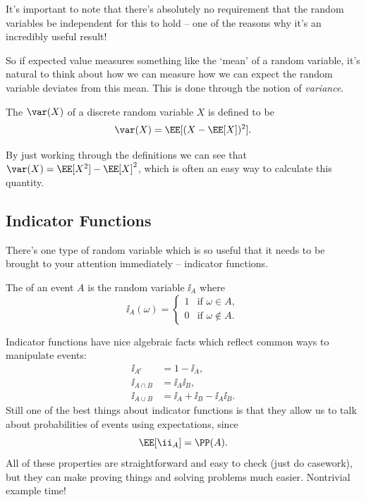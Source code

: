 It's important to note that there's absolutely no requirement that the random variables be independent for this to hold -- one of the reasons why it's an incredibly useful result!

So if expected value measures something like the `mean' of a random variable, it's natural to think about how we can measure how we can expect the random variable deviates from this mean. This is done through the notion of \emph{variance}.

\begin{definition}[Variance]
	The  $\var(X)$ of a discrete random variable $X$ is defined to be
	$$
\var(X) = \EE[(X - \EE[X])^2].
	$$
\end{definition}

By just working through the definitions we can see that $\var(X) = \EE[X^2] - \EE[X]^2$, which is often an easy way to calculate this quantity.

\subsection{Indicator Functions}

There's one type of random variable which is so useful that it needs to be brought to your attention immediately -- indicator functions.

\begin{definition}
	The  of an event $A$ is the random variable $\ii_A$ where
	$$
\ii_A(\omega) = \begin{cases}
	1 &\mbox{if } \omega  \in A, \\
	0 &\mbox{if } \omega  \not \in A.
   \end{cases}
	$$
\end{definition}

Indicator functions have nice algebraic facts which reflect common ways to manipulate events:
\begin{align*}
	\ii_{A^c} &= 1 - \ii_A, \\
	\ii_{A \cap B} &= \ii_A \ii_B, \\
	\ii_{A \cup B} &= \ii_A + \ii_B - \ii_A \ii_B.
\end{align*}
Still one of the best things about indicator functions is that they allow us to talk about probabilities of events using expectations, since
$$
\EE[\ii_A]= \PP(A).
$$
All of these properties are straightforward and easy to check (just do casework), but they can make proving things and solving problems much easier. Nontrivial example time!


